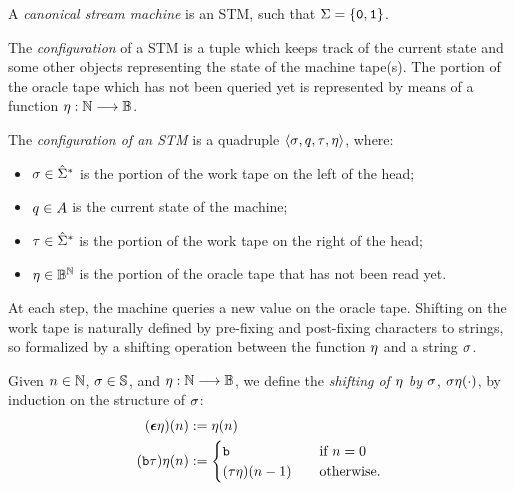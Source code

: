 \begin{defn}\label{df:canonicalSTM}
A \emph{canonical stream machine} is an STM,
such that
$\textcolor{black}{\Sigma}=\{\textcolor{black}{\mathtt{0}}, \textcolor{black}{\mathtt{1}}\}$.
\end{defn}





The \emph{configuration} of a  STM is
a tuple which keeps track of the current state
and some other objects representing the state of the
machine tape(s).
%
The portion of the oracle tape
which has not been
queried yet is represented by means of a function
$\textcolor{black}{\eta} : \mathbb{N} \longrightarrow \mathbb{B}$.


\begin{defn}\label{df:STMConfiguration}
The \emph{configuration of an STM}
is a quadruple $\langle \textcolor{black}{\sigma},
\textcolor{black}{q}, \textcolor{black}{\tau}, \textcolor{black}{\eta}\rangle$,
where:
\begin{itemize}
\itemsep0em
%
\item $\textcolor{black}{\sigma} \in \hat{\Sigma}^*$
is the portion of the work tape on the left of the head;
%
\item $\textcolor{black}{q}\in A$ is the current state of the machine;
%
\item $\textcolor{black}{\tau} \in \hat{\Sigma}^*$ is the portion of the
work tape on the right of the head;
%
\item $\textcolor{black}{\eta} \in \mathbb{B}^{\mathbb{N}}$ is the portion
of the oracle tape that has not been read yet.
\end{itemize}
\end{defn}
%
%
\noindent
At each step, the machine queries a new value
on the oracle tape.
%
Shifting on the work tape is naturally defined by
pre-fixing and post-fixing characters to strings,
so formalized by a shifting operation
between the function $\textcolor{black}{\eta}$
and a string $\textcolor{black}{\sigma}$.



\begin{defn}\label{df:shifting}
Given $n\in \mathbb{N}$, $\textcolor{black}{\sigma} \in \mathbb{S}$, and
$\textcolor{black}{\eta}:\mathbb{N} \longrightarrow \mathbb{B}$,
we define the \emph{shifting of $\textcolor{black}{\eta}$
by %
$\textcolor{black}{\sigma}$},
$\textcolor{black}{\sigma \eta}(\cdot)$,
by induction on the structure of $\textcolor{black}{\sigma}$:
\begin{align*}
(\m{\eepsilon} \m{\eta})(n) &:= \m{\eta}(n) \\
%
(\m{\bool \tau}) \m{\eta}(n) &:= \begin{cases}
\m{\bool} \ \ \ &\text{if } n=0 \\
(\m{\tau \eta})(n-1) \ \ \ &\text{otherwise.}
\end{cases}
\end{align*}
\end{defn}


